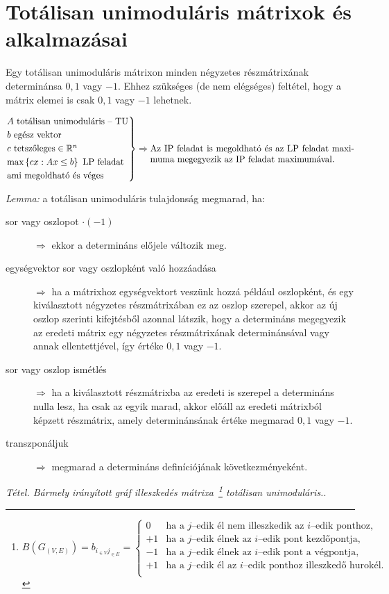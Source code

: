 \skiptooddpage
\section{Totálisan unimoduláris mátrixok és alkalmazásai}

Egy totálisan unimoduláris mátrixon minden négyzetes részmátrixának determinánsa
$0, 1$ vagy $-1$. Ehhez szükséges (de nem elégséges) feltétel, hogy a mátrix
elemei is csak $0, 1$ vagy $-1$ lehetnek.

\[
\begin{rcases}
A \text{ totálisan unimoduláris -- TU} \\
b \text{ egész vektor} \\
c \text{ tetszőleges} \in \mathbb{R}^n \\
\text{max} \left\{ cx:Ax \leq b \right\} \text{ LP feladat}\\
\text{ami megoldható és véges}
\end{rcases} \Rightarrow \parbox[t]{8cm}{ Az IP feladat is megoldható és az LP
feladat maximuma megegyezik az IP feladat maximumával.} \]

\emph{Lemma:} a totálisan unimoduláris tulajdonság megmarad, ha:

\begin{description}
\item[sor vagy oszlopot $\cdot (-1)$] $\Rightarrow$ ekkor a determináns
előjele változik meg.
\item[egységvektor sor vagy oszlopként való hozzáadása] $\Rightarrow$ ha a
mátrixhoz egységvektort veszünk hozzá például oszlopként, és egy kiválasztott
négyzetes részmátrixában ez az oszlop szerepel, akkor az új oszlop szerinti
kifejtésből azonnal látszik, hogy a determináns megegyezik az eredeti mátrix
egy négyzetes részmátrixának determinánsával vagy annak ellentettjével, így
értéke $0, 1$ vagy $-1$.
\item[sor vagy oszlop ismétlés] $\Rightarrow$ ha a kiválasztott részmátrixba
az eredeti is szerepel a determináns nulla lesz, ha csak az egyik marad, akkor
előáll az eredeti mátrixból képzett részmátrix, amely determinánsának értéke
megmarad $0, 1$ vagy $-1$.
\item[transzponáljuk] $\Rightarrow$ megmarad a determináns definíciójának
következményeként.
\end{description}

\emph{Tétel. Bármely irányított gráf illeszkedés mátrixa~\footnote{$
B(G_{(V,E)})=
b_{i_{\in V}j_{\in E}}=
\begin{cases}
0  & \text{ha a } j \text{--edik él nem illeszkedik az } i \text{--edik ponthoz,} \\
+1  & \text{ha a } j \text{--edik élnek az } i \text{--edik pont kezdőpontja,} \\
-1  & \text{ha a } j \text{--edik élnek az } i \text{--edik pont a végpontja,} \\
+1  & \text{ha a } j \text{--edik él az } i \text{--edik ponthoz illeszkedő hurokél.} \\
\end{cases}$} totálisan unimoduláris.}.
\vspace{0.4cm}

